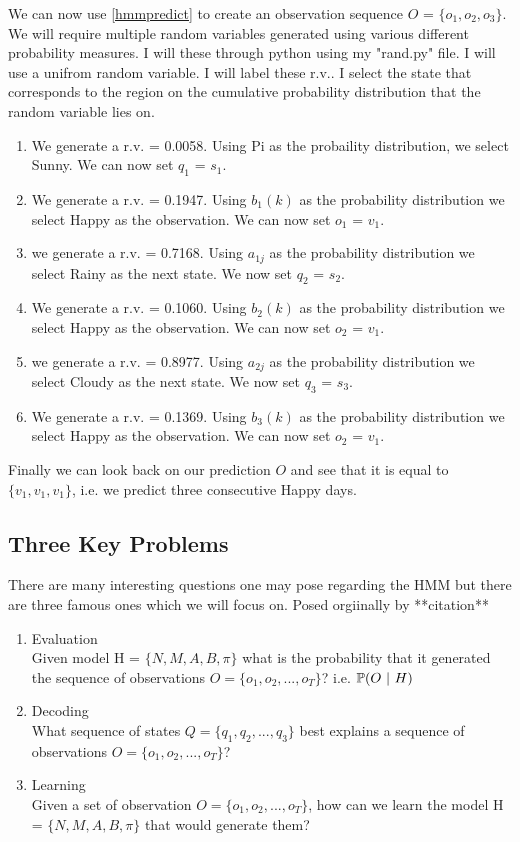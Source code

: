 \begin{example}
    We can now use \ref{hmmpredict} to create an observation sequence $O$ = $\{o_1, o_2, o_3\}$. We will require multiple random variables generated using various different probability measures. I will these through python using my "rand.py" file. I will use a unifrom random variable. I will label these r.v.. I select the state that corresponds to the region on the cumulative probability distribution that the random variable lies on.
    \begin{enumerate}[i]
        \item We generate a r.v. = 0.0058. Using Pi as the probaility distribution, we select Sunny. We can now set $q_1$ = $s_1$.
        \item We generate a r.v. = 0.1947. Using $b_1(k)$ as the probability distribution we select Happy as the observation. We can now set $o_1$ = $v_1$.
        \item we generate a r.v. = 0.7168. Using $a_{1j}$ as the probability distribution we select Rainy as the next state. We now set $q_2$ = $s_2$.
        \item We generate a r.v. = 0.1060. Using $b_2(k)$ as the probability distribution we select Happy as the observation. We can now set $o_2$ = $v_1$.
        \item we generate a r.v. = 0.8977. Using $a_{2j}$ as the probability distribution we select Cloudy as the next state. We now set $q_3$ = $s_3$.
        \item We generate a r.v. = 0.1369. Using $b_3(k)$ as the probability distribution we select Happy as the observation. We can now set $o_2$ = $v_1$.
    \end{enumerate}
    Finally we can look back on our prediction $O$ and see that it is equal to $\{v_1,v_1,v_1\}$, i.e. we predict three consecutive Happy days.
\end{example}


\subsection{Three Key Problems}
There are many interesting questions one may pose regarding the HMM but there are three famous ones which we will focus on. Posed orgiinally by **citation**
\begin{enumerate}
    \item \label{q:first} Evaluation \\ Given model H = $\{N,M,A,B,\pi\}$ what is the probability that it generated the sequence of observations $O = \{o_1,o_2,...,o_T\}$? i.e. $\mathbb{P} (O \ | \ H)$
    \item \label{q:second} Decoding \\ What sequence of states $Q = \{q_1, q_2,..., q_3\}$ best explains a sequence of observations $O = \{o_1,o_2,...,o_T\}$?
    \item \label{q:third} Learning \\ Given a set of observation $O = \{o_1,o_2,...,o_T\}$, how can we learn the model H = $\{N,M,A,B,\pi\}$ that would generate them?
\end{enumerate}

